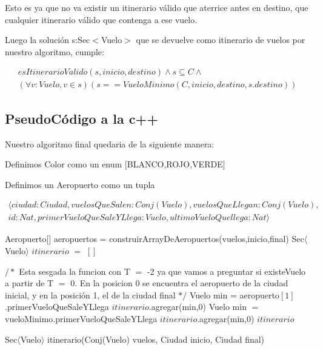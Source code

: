 Esto es ya que no va existir un itinerario v\'alido que aterrice antes en destino, que cualquier itinerario v\'alido que contenga a ese vuelo.

Luego la soluci\'on s:Sec$<$Vuelo$>$ que se devuelve como itinerario de vuelos por nuestro algoritmo, cumple:

\begin{align*}
esItinerarioValido(s,inicio,destino) \wedge s \subseteq C \wedge \\
(\forall v:Vuelo, v \in s)(s == VueloMinimo(C,inicio,destino,s.destino))
\end{align*}

\newpage
\subsection{PseudoC\'odigo a la c++}


Nuestro algoritmo final quedaria de la siguiente manera:

Definimos Color como un enum $[$BLANCO,ROJO,VERDE$]$

Definimos un Aeropuerto como un tupla 

\begin{align*}
\langle ciudad:Ciudad,vuelosQueSalen:
Conj(Vuelo),vuelosQueLlegan:Conj(Vuelo),\\
id:Nat,primerVueloQueSaleYLlega:Vuelo,ultimoVueloQuellega:Nat \rangle 
\end{align*}

\begin{algorithm}[H]
\begin{algorithmic}[1]
\STATE Aeropuerto[] aeropuertos = construirArrayDeAeropuertos(vuelos,inicio,final)
\STATE Sec$\langle$Vuelo$\rangle$ $itinerario$ $=$ $[]$

$/*$ Esta sesgada la funcion con T $=$ -2 ya que vamos a preguntar si existeVuelo a partir de T $=$ 0.
En la posicion 0 se encuentra el aeropuerto de la ciudad inicial, y en la posici\'on 1, el de la ciudad final $*/$
	\STATE Vuelo min = aeropuerto$[1]$.primerVueloQueSaleYLlega
\STATE $itinerario$.agregar(min,0)
	\STATE Vuelo min $=$ vueloMinimo.primerVueloQueSaleYLlega
	\STATE $itinerario$.agregar(min,0)
\ENDWHILE
\ENDIF
\RETURN $itinerario$
\caption{Sec$\langle$Vuelo$\rangle$ itinerario(Conj(Vuelo) vuelos, Ciudad inicio, Ciudad final)}%
\end{algorithmic}
\end{algorithm}

